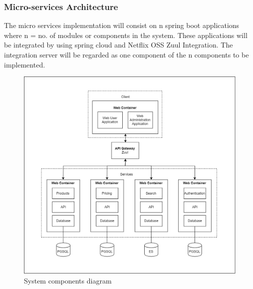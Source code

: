 \documentclass[a4paper,10pt]{article}
\begin{document}
\subsubsection{Micro-services Architecture}
The micro services implementation will consist on n spring boot applications where n = no. of modules or components in the system. These applications will be integrated by using spring cloud and Netflix OSS Zuul Integration. The integration server will be regarded as one component of the n components to be implemented.
\begin{figure}[H]
	\includegraphics[scale=0.25]{component_diagram}
	\caption{System components diagram}
\end{figure}
\end{document}
